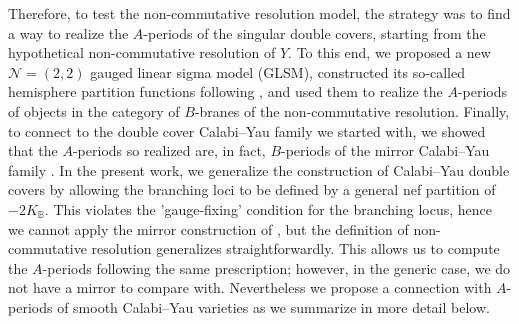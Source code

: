 \documentclass[12pt,a4paper,oneside]{amsart}
\numberwithin{equation}{section}
\theoremstyle{definition}
\theoremstyle{remark}
\begin{document}
Therefore, to test the non-commutative resolution model, the strategy was to find a way to realize the $A$-periods of the singular double covers, starting from the hypothetical non-commutative resolution of $Y$. To this end, we proposed a new $\mathcal{N}=(2,2)$ gauged linear sigma model (GLSM), constructed its so-called hemisphere partition functions following \cite{Hori:2013ika}, and used them to realize the $A$-periods of objects in the category of $B$-branes of the non-commutative resolution. Finally, to connect to the double cover Calabi--Yau family we started with, we showed that the $A$-periods so realized are, in fact, $B$-periods of the mirror Calabi--Yau family \cite{Lee:2023piu}. In the present work, we generalize the construction of Calabi--Yau double covers by allowing the branching loci to be defined by a general nef partition of $-2K_{\mathbb{B}}$. This violates the 'gauge-fixing' condition for the branching locus, hence we cannot apply the mirror construction of \cite{Hosono:2020gpj}, but the definition of non-commutative resolution generalizes straightforwardly. This allows us to compute the $A$-periods following the same prescription; however, in the generic case, we do not have a mirror to compare with. Nevertheless we propose a connection with $A$-periods of smooth Calabi--Yau varieties as we summarize in more detail below.
\end{document}
